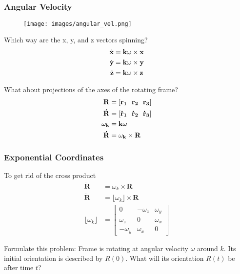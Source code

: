 \subsubsection{Angular Velocity}
\begin{figure}[H]
  \begin{center}
    \texttt{[image: images/angular\_vel.png]}
  \end{center}
  \label{fig:Angular velocity}
\end{figure}

Which way are the x, y, and z vectors spinning?
\begin{align*}
  \dot{\bf{x}} &= \bf{k}\omega \times \bf{x} \\
  \dot{\bf{y}} &= \bf{k}\omega \times \bf{y} \\
  \dot{\bf{z}} &= \bf{k}\omega \times \bf{z}
\end{align*}

What about projections of the axes of the rotating frame?
\begin{align*}
  \bf{R} &= [\bf{r}_1 \ \ \bf{r}_2 \ \ \bf{r}_3] \\
  \bf{\dot{R}} & = [\bf{\dot{r}}_1 \ \ \bf{\dot{r}}_2 \ \ \bf{\dot{r}}_3] \\
  \bf{\omega}_k &= \bf{k} \omega \\
  \bf{\dot{R}} &= \bf{\omega}_k \times \bf{R}
\end{align*}

\subsubsection{Exponential Coordinates}
To get rid of the cross product
\begin{align*}
  \dot{\mathbf{R}} & = \omega_k \times \mathbf{R} \\
  \dot{\mathbf{R}} & = \lfloor \omega_k \rfloor \times \mathbf{R} \\
  \lfloor \omega_k \rfloor &= \begin{bmatrix} 0 & -\omega_z & \omega_y \\ \omega_z & 0 & \omega_x \\ -\omega_y & \omega_x & 0\end{bmatrix}
\end{align*}

Formulate this problem:
Frame is rotating at angular velocity $\omega$ around $k$.
Its initial orientation is described by $R(0)$.
What will its orientation $R(t)$ be after time $t$? \\

